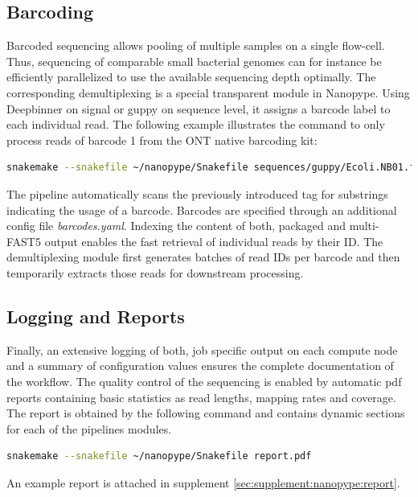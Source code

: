\subsection{Barcoding}
\label{subsec:nanopype:barcoding}
Barcoded sequencing allows pooling of multiple samples on a single flow-cell. Thus, sequencing of comparable small bacterial genomes can for instance be efficiently parallelized to use the available sequencing depth optimally. The corresponding demultiplexing is a special transparent module in Nanopype. Using Deepbinner \cite{Wick2018} on signal or guppy on sequence level, it assigns a barcode label to each individual read.  The following example illustrates the command to only process reads of barcode 1 from the ONT native barcoding kit:

\begin{lstlisting}[language=sh, caption=Nanopype demultiplexing]
snakemake --snakefile ~/nanopype/Snakefile sequences/guppy/Ecoli.NB01.fastq.gz
\end{lstlisting}

The pipeline automatically scans the previously introduced tag for substrings indicating the usage of a barcode. Barcodes are specified through an additional config file \textit{barcodes.yaml}.
Indexing the content of both, packaged and multi-FAST5 output enables the fast retrieval of individual reads by their ID. The demultiplexing module first generates batches of read IDs per barcode and then temporarily extracts those reads for downstream processing.


\subsection{Logging and Reports}
\label{subsec:nanopype:logging}

Finally, an extensive logging of both, job specific output on each compute node and a summary of configuration values ensures the complete documentation of the workflow. The quality control of the sequencing is enabled by automatic pdf reports containing basic statistics as read lengths, mapping rates and coverage. The report is obtained by the following command and contains dynamic sections for each of the pipelines modules.

\begin{lstlisting}[language=sh, caption=Nanopype report]
snakemake --snakefile ~/nanopype/Snakefile report.pdf
\end{lstlisting}

An example report is attached in supplement \ref{sec:supplement:nanopype:report}.




